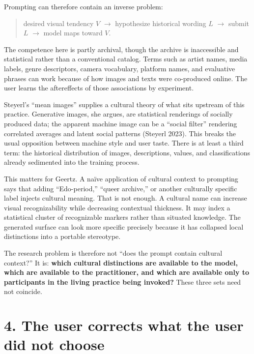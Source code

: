 \documentclass[
  11pt,
  letterpaper,
]{article}
\begin{document}
Prompting can therefore contain an inverse problem:

\begin{quote}
desired visual tendency $V$ $\rightarrow$ hypothesize historical wording $L$ $\rightarrow$ submit $L$ $\rightarrow$ model maps toward $V$.
\end{quote}

The competence here is partly archival, though the archive is
inaccessible and statistical rather than a conventional catalog. Terms
such as artist names, media labels, genre descriptors, camera
vocabulary, platform names, and evaluative phrases can work because of
how images and texts were co-produced online. The user learns the
aftereffects of those associations by experiment.

Steyerl's ``mean images'' supplies a cultural theory of what sits
upstream of this practice. Generative images, she argues, are
statistical renderings of socially produced data; the apparent machine
image can be a ``social filter'' rendering correlated averages and
latent social patterns (Steyerl 2023). This breaks the usual opposition
between machine style and user taste. There is at least a third term:
the historical distribution of images, descriptions, values, and
classifications already sedimented into the training process.

This matters for Geertz. A naïve application of cultural context to
prompting says that adding ``Edo-period,'' ``queer archive,'' or another
culturally specific label injects cultural meaning. That is not enough.
A cultural name can increase visual recognizability while decreasing
contextual thickness. It may index a statistical cluster of recognizable
markers rather than situated knowledge. The generated surface can look
more specific precisely because it has collapsed local distinctions into
a portable stereotype.

The research problem is therefore not ``does the prompt contain cultural
context?'' It is: \textbf{which cultural distinctions are available to
the model, which are available to the practitioner, and which are
available only to participants in the living practice being invoked?}
These three sets need not coincide.

\section{4. The user corrects what the user did not
choose}\label{the-user-corrects-what-the-user-did-not-choose}
\end{document}
